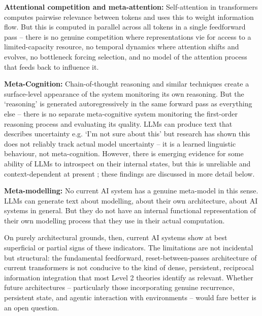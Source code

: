 \documentclass[11pt, a4paper, onecolumn, gdm]{google}
\begin{document}
\textbf{Attentional competition and meta-attention:} Self-attention in transformers computes pairwise relevance between tokens and uses this to weight information flow.
But this is computed in parallel across all tokens in a single feedforward pass -- there is no genuine competition where representations vie for access to a limited-capacity resource, no temporal dynamics where attention shifts and evolves, no bottleneck forcing selection, and no model of the attention process that feeds back to influence it.

\textbf{Meta-Cognition:} Chain-of-thought reasoning and similar techniques create a surface-level appearance of the system monitoring its own reasoning.
But the `reasoning' is generated autoregressively in the same forward pass as everything else -- there is no separate meta-cognitive system monitoring the first-order reasoning process and evaluating its quality.
LLMs can produce text that describes uncertainty e.g. `I'm not sure about this' but research has shown this does not reliably track actual model uncertainty \citep{xiong2024,yona2024} -- it is a learned linguistic behaviour, not meta-cognition.
However, there is emerging evidence for some ability of LLMs to introspect on their internal states, but this is unreliable and context-dependent at present \citep{lindsey2026}; these findings are discussed in more detail below.

\textbf{Meta-modelling:} No current AI system has a genuine meta-model in this sense.
LLMs can generate text about modelling, about their own architecture, about AI systems in general.
But they do not have an internal functional representation of their own modelling process that they use in their actual computation.

On purely architectural grounds, then, current AI systems show at best superficial or partial signs of these indicators.
The limitations are not incidental but structural: the fundamental feedforward, reset-between-passes architecture of current transformers is not conducive to the kind of dense, persistent, reciprocal information integration that most Level 2 theories identify as relevant.
Whether future architectures -- particularly those incorporating genuine recurrence, persistent state, and agentic interaction with environments -- would fare better is an open question.
\end{document}
